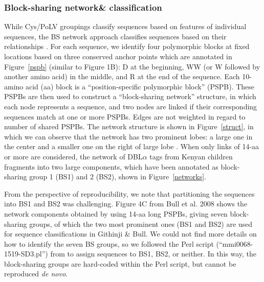 \documentclass[10pt,twocolumn,superscriptaddress]{revtex4-1}
\newcommand{\dbla}{{DBL$\alpha$}\xspace}
\newcommand{\cp}{{Cys/PoLV}\xspace}
\newcommand{\paper}{{Githinji \& Bull}\xspace}
\newcommand{\figdir}{figures/}
\begin{document}
\subsubsection{Block-sharing network\& classification}

While \cp groupings classify sequences based on features of individual sequences, the BS network approach classifies sequences based on their relationships \cite{bull2008}. For each sequence, we identify four polymorphic blocks at fixed locations based on three conserved anchor points which are annotated in Figure~\ref{pspb} (similar to \cite{bull2008} Figure 1B): D at the beginning, WW (or W followed by another amino acid) in the middle, and R at the end of the sequence. Each 10-amino acid (aa) block is a ``position-specific polymorphic block'' (PSPB). These PSPBs are then used to construct a ``block-sharing network'' structure, in which each node represents a sequence, and two nodes are linked if their corresponding sequences match at one or more PSPBs. Edges are not weighted in regard to number of shared PSPBs. The network structure is shown in Figure~\ref{struct}, in which we can observe that the network has two prominent lobes: a large one in the center and a smaller one on the right of large lobe \cite{bull2008} \cite{githinji2017}. When only links of 14-aa or more are considered, the network of \dbla tags from Kenyan children \cite{bull2008} fragments into two large components, which have been annotated as block-sharing group 1 (BS1) and 2 (BS2), shown in Figure~\ref{networks}.  

From the perspective of reproducibility, we note that partitioning the sequences into BS1 and BS2 was challenging. Figure 4C from Bull et al. 2008 \cite{bull2008} shows the network components obtained by using 14-aa long PSPBs, giving seven block-sharing groups, of which the two most prominent ones (BS1 and BS2) are used for sequence classifications in \paper. We could not find more details on how to identify the seven BS groups, so we followed the Perl script (``mmi0068-1519-SD3.pl'') from \cite{bull2008} to assign sequences to BS1, BS2, or neither. In this way, the block-sharing groups are hard-coded within the Perl script, but cannot be reproduced \textit{de novo}.  

\end{document}
